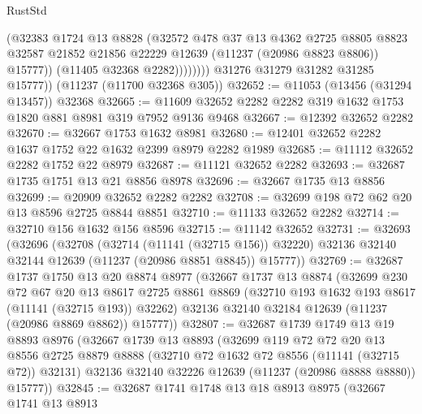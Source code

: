 \begin{lexlean}{RustStd}
\begin{coremodule}
                      (@32383
                        @1724
                        @13
                        @8828
                        (@32572
                          @478
                          @37
                          @13
                          @4362
                          @2725
                          @8805
                          @8823
                          @32587
                          @21852
                          @21856
                          @22229
                          @12639
                          (@11237 (@20986 @8823 @8806))
                          @15777))
                      (@11405 @32368 @2282))))))))
        @31276
        @31279
        @31282
        @31285
        @15777))
    (@11237 (@11700 @32368 @305))
@32652 := @11053 (@13456 (@31294 @13457)) @32368
@32665 := @11609 @32652 @2282 @2282 @319 @1632 @1753 @1820 @881 @8981 @319 @7952 @9136 @9468
@32667 := @12392 @32652 @2282
@32670 := @32667 @1753 @1632 @8981
@32680 := @12401 @32652 @2282 @1637 @1752 @22 @1632 @2399 @8979 @2282 @1989
@32685 := @11112 @32652 @2282 @1752 @22 @8979
@32687 := @11121 @32652 @2282
@32693 := @32687 @1735 @1751 @13 @21 @8856 @8978
@32696 := @32667 @1735 @13 @8856
@32699 := @20909 @32652 @2282 @2282
@32708 := @32699 @198 @72 @62 @20 @13 @8596 @2725 @8844 @8851
@32710 := @11133 @32652 @2282
@32714 := @32710 @156 @1632 @156 @8596
@32715 := @11142 @32652
@32731 := @32693
    (@32696
      (@32708
        (@32714 (@11141 (@32715 @156)) @32220)
        @32136
        @32140
        @32144
        @12639
        (@11237 (@20986 @8851 @8845))
        @15777))
@32769 := @32687
    @1737
    @1750
    @13
    @20
    @8874
    @8977
    (@32667
      @1737
      @13
      @8874
      (@32699
        @230
        @72
        @67
        @20
        @13
        @8617
        @2725
        @8861
        @8869
        (@32710 @193 @1632 @193 @8617 (@11141 (@32715 @193)) @32262)
        @32136
        @32140
        @32184
        @12639
        (@11237 (@20986 @8869 @8862))
        @15777))
@32807 := @32687
    @1739
    @1749
    @13
    @19
    @8893
    @8976
    (@32667
      @1739
      @13
      @8893
      (@32699
        @119
        @72
        @72
        @20
        @13
        @8556
        @2725
        @8879
        @8888
        (@32710 @72 @1632 @72 @8556 (@11141 (@32715 @72)) @32131)
        @32136
        @32140
        @32226
        @12639
        (@11237 (@20986 @8888 @8880))
        @15777))
@32845 := @32687
    @1741
    @1748
    @13
    @18
    @8913
    @8975
    (@32667
      @1741
      @13
      @8913

\end{coremodule}
\end{lexlean}

